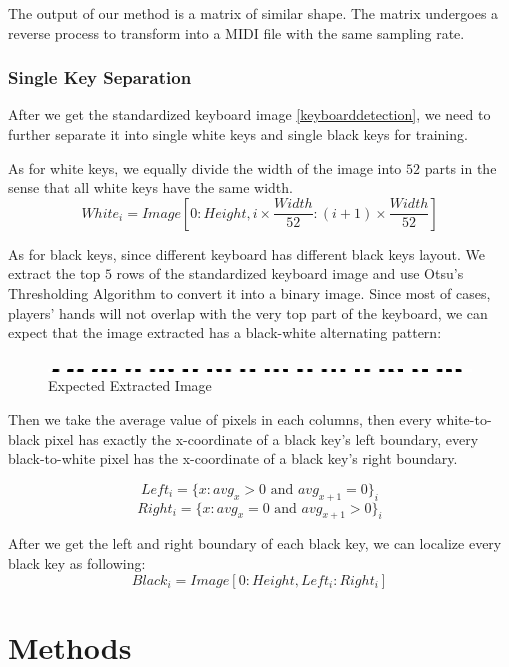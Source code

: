 \documentclass[10pt,twocolumn,letterpaper]{article}
\begin{document}
The output of our method is a matrix of similar shape. 
The matrix undergoes a reverse process to transform into a MIDI file with the same sampling rate.

\subsubsection{Single Key Separation}

After we get the standardized keyboard image \ref{keyboarddetection}, we need to further separate it into single white keys and single black keys for training.

As for white keys, we equally divide the width of the image into \(52\) parts in the sense that all white keys have the same width.
\[White_i = Image[0:Height, i \times \frac{Width}{52}: (i + 1)\times\frac{Width}{52}]\]

As for black keys, since different keyboard has different black keys layout. We extract the top \(5\) rows of the standardized keyboard image and use Otsu's Thresholding Algorithm to convert it into a binary image. Since most of cases, players' hands will not overlap with the very top part of the keyboard, we can expect that the image extracted has a black-white alternating pattern:

\begin{figure}[h!]
   \centering
   \includegraphics[width=\linewidth, height=0.04\linewidth]{fig/17.jpg}
   \caption{Expected Extracted Image}
\end{figure}

Then we take the average value of pixels in each columns, then every white-to-black pixel has exactly the x-coordinate of a black key's left boundary, every black-to-white pixel has the x-coordinate of a black key's right boundary.

\[Left_i = \{x: avg_x > 0 \text{ and } avg_{x + 1} = 0\}_i\]
\[Right_i = \{x: avg_x = 0 \text{ and } avg_{x + 1} > 0\}_i\]

After we get the left and right boundary of each black key, we can localize every black key as following:
\[Black_i = Image[0:Height, Left_i : Right_i]\]


\section{Methods}
\end{document}
